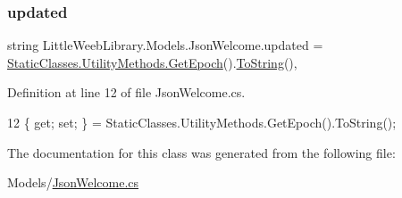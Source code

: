 \subsubsection{\texorpdfstring{updated}{updated}}
{\footnotesize\ttfamily string Little\+Weeb\+Library.\+Models.\+Json\+Welcome.\+updated = \mbox{\hyperlink{class_little_weeb_library_1_1_static_classes_1_1_utility_methods_a12336d9e64983ddabaad8950486fafb2}{Static\+Classes.\+Utility\+Methods.\+Get\+Epoch}}().\mbox{\hyperlink{class_little_weeb_library_1_1_models_1_1_json_welcome_a762f38491c69ca0d0c2c17e4582a145c}{To\+String}}()\hspace{0.3cm}{\ttfamily [get]}, {\ttfamily [set]}}



Definition at line 12 of file Json\+Welcome.\+cs.


\begin{DoxyCode}
12 \{ \textcolor{keyword}{get}; \textcolor{keyword}{set}; \} = StaticClasses.UtilityMethods.GetEpoch().ToString();
\end{DoxyCode}


The documentation for this class was generated from the following file\+:\begin{DoxyCompactItemize}
\item 
Models/\mbox{\hyperlink{_json_welcome_8cs}{Json\+Welcome.\+cs}}\end{DoxyCompactItemize}
